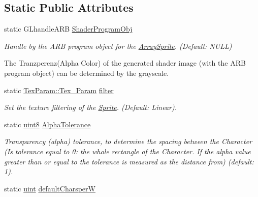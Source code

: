 \subsection*{Static Public Attributes}
\begin{DoxyCompactItemize}
\item 
\hypertarget{class_f2_c_1_1_font_sprite_aed3db6661c90a9d48cfd76b0e77c9c98}{
static GLhandleARB \hyperlink{class_f2_c_1_1_font_sprite_aed3db6661c90a9d48cfd76b0e77c9c98}{ShaderProgramObj}}
\label{class_f2_c_1_1_font_sprite_aed3db6661c90a9d48cfd76b0e77c9c98}

\begin{DoxyCompactList}\small\item\em Handle by the ARB program object for the \hyperlink{class_f2_c_1_1_array_sprite}{ArraySprite}. (Default: NULL) \par
 The Tranzperenz(Alpha Color) of the generated shader image (with the ARB program object) can be determined by the grayscale. \item\end{DoxyCompactList}\item 
\hypertarget{class_f2_c_1_1_font_sprite_aba43429eee849af1fd7466f8a6e5291c}{
static \hyperlink{namespace_f2_c_1_1_tex_param_a64299c3972944468af4e8b0394c936c6}{TexParam::Tex\_\-Param} \hyperlink{class_f2_c_1_1_font_sprite_aba43429eee849af1fd7466f8a6e5291c}{filter}}
\label{class_f2_c_1_1_font_sprite_aba43429eee849af1fd7466f8a6e5291c}

\begin{DoxyCompactList}\small\item\em Set the texture filtering of the \hyperlink{class_f2_c_1_1_sprite}{Sprite}. (Default: Linear). \item\end{DoxyCompactList}\item 
\hypertarget{class_f2_c_1_1_font_sprite_a69244b901df9ec25c6a96e5a51dedb7e}{
static \hyperlink{namespace_f2_c_a711deb33697d145669b9c0c4fe87c7ca}{uint8} \hyperlink{class_f2_c_1_1_font_sprite_a69244b901df9ec25c6a96e5a51dedb7e}{AlphaTolerance}}
\label{class_f2_c_1_1_font_sprite_a69244b901df9ec25c6a96e5a51dedb7e}

\begin{DoxyCompactList}\small\item\em Transparency (alpha) tolerance, to determine the spacing between the Character (Is tolerance equal to 0: the whole rectangle of the Character. If the alpha value greater than or equal to the tolerance is measured as the distance from) (default: 1). \item\end{DoxyCompactList}\item 
\hypertarget{class_f2_c_1_1_font_sprite_a4391313f8fd3a47ae2b9941d8540a098}{
static \hyperlink{namespace_f2_c_a58be2bac9eb3e3c99cb41b6008bf4fae}{uint} \hyperlink{class_f2_c_1_1_font_sprite_a4391313f8fd3a47ae2b9941d8540a098}{defaultCharsperW}}
\label{class_f2_c_1_1_font_sprite_a4391313f8fd3a47ae2b9941d8540a098}


\end{DoxyCompactItemize}

